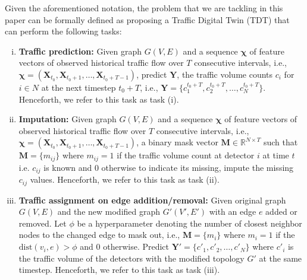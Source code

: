 Given the aforementioned notation, the problem that we are tackling in this paper can be formally defined as proposing a Traffic Digital Twin (TDT) that can perform the following tasks:
\begin{enumerate}[(i)]
    \item \textbf{Traffic prediction:} Given graph $G(V, E)$ and a sequence $\bm{\chi}$ of feature vectors of observed historical traffic flow over $T$ consecutive intervals, i.e., $\bm{\chi} = (\mathbf{X}_{t_0}, \mathbf{X}_{t_0+1}, \ldots, \mathbf{X}_{t_0+T-1})$, predict $\mathbf{Y}$, the traffic volume counts $c_i$ for $i \in N$ at the next timestep $t_0+T$, i.e., $\mathbf{Y} = \{c_1^{t_0+T}, c_2^{t_0+T}, \ldots, c_N^{t_0+T}\}$. Henceforth, we refer to this task as task (i).
    \item \textbf{Imputation:} Given graph $G(V, E)$ and a sequence $\bm{\chi}$ of feature vectors of observed historical traffic flow over $T$ consecutive intervals, i.e., $\bm{\chi} = (\mathbf{X}_{t_0}, \mathbf{X}_{t_0+1}, \ldots, \mathbf{X}_{t_0+T-1})$, a binary mask vector $\mathbf{M} \in \mathbb{R}^{N \times T}$ such that $\mathbf{M} = \{m_{ij}\}$ where $m_{ij} = 1$ if the traffic volume count at detector $i$ at time $t$ i.e. $c_{ij}$ is known and 0 otherwise to indicate its missing, impute the missing $c_{ij}$ values. Henceforth, we refer to this task as task (ii).
    \item \textbf{Traffic assignment on edge addition/removal:} Given original graph $G(V,E)$ and the new modified graph $G'(V', E')$ with an edge $e$ added or removed. Let $\phi$ be a hyperparameter denoting the number of closest neighbor nodes to the changed edge to mask out, i.e., $\mathbf{M} = \{m_i\}$ where $m_i = 1$ if the $\text{dist}(v_i,e)> \phi$ and 0 otherwise. Predict $\mathbf{Y'} = \{c'_1, c'_2, \ldots, c'_N \}$ where $c'_i$ is the traffic volume of the detectors with the modified topology $G'$ at the same timestep. Henceforth, we refer to this task as task (iii).
\end{enumerate}
